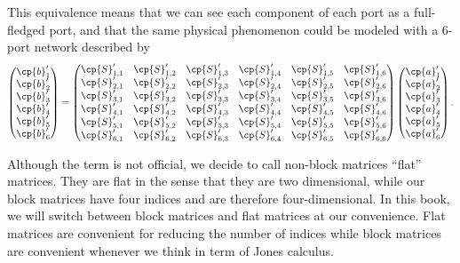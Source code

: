 This equivalence means that we can see each component of each port as a full-fledged port, and that the same physical phenomenon could be modeled with a 6-port network described by
\begin{equation}
    \begin{pmatrix}
        \cp{b}'_1 \\ \cp{b}'_2 \\ \cp{b}'_3 \\ \cp{b}'_{4} \\ \cp{b}'_{5} \\ \cp{b}'_{6}
    \end{pmatrix}
    =
    \begin{pmatrix}
        \cp{S}'_{1, 1} & \cp{S}'_{1, 2} & \cp{S}'_{1, 3} & \cp{S}'_{1, 4} & \cp{S}'_{1, 5} & \cp{S}'_{1, 6} \\
        \cp{S}'_{2, 1} & \cp{S}'_{2, 2} & \cp{S}'_{2, 3} & \cp{S}'_{2, 4} & \cp{S}'_{2, 5} & \cp{S}'_{2, 6} \\
        \cp{S}'_{3, 1} & \cp{S}'_{3, 2} & \cp{S}'_{3, 3} & \cp{S}'_{3, 4} & \cp{S}'_{3, 5} & \cp{S}'_{3, 6} \\
        \cp{S}'_{4, 1} & \cp{S}'_{4, 2} & \cp{S}'_{4, 3} & \cp{S}'_{4, 4} & \cp{S}'_{4, 5} & \cp{S}'_{4, 6} \\
        \cp{S}'_{5, 1} & \cp{S}'_{5, 2} & \cp{S}'_{5, 3} & \cp{S}'_{5, 4} & \cp{S}'_{5, 5} & \cp{S}'_{5, 6} \\
        \cp{S}'_{6, 1} & \cp{S}'_{6, 2} & \cp{S}'_{6, 3} & \cp{S}'_{6, 4} & \cp{S}'_{6, 5} & \cp{S}'_{6, 6}
    \end{pmatrix}
    \begin{pmatrix}
        \cp{a}'_1 \\ \cp{a}'_2 \\ \cp{a}'_3 \\ \cp{a}'_{4} \\ \cp{a}'_{5} \\ \cp{a}'_{6}
    \end{pmatrix}
    \text{.}
    \label{eq:matrix_totally_flattenned}
\end{equation}

Although the term is not official, we decide to call non-block matrices ``flat'' matrices.
They are flat in the sense that they are two dimensional, while our block matrices have four indices and are therefore four-dimensional.
In this book, we will switch between block matrices and flat matrices at our convenience.
Flat matrices are convenient for reducing the number of indices while block matrices are convenient whenever we think in term of Jones calculus.


